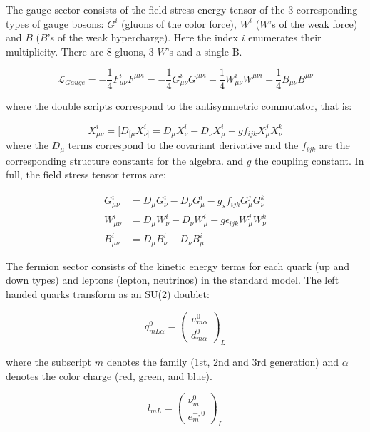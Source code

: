 The gauge sector consists of the field stress energy tensor of the 3 corresponding types of gauge bosons:
 $G^i$ (gluons of the color force), $W^i$ ($W$'s of the weak force) and $B$ ($B$'s of the weak hypercharge). 
Here the index $i$ enumerates their multiplicity. There are 8 gluons, 3 $W$'s and a single B. 

\begin{equation}
\mathcal{L}_{Gauge} = - \frac{1}{4} F_{\mu\nu}^{i} F^{\mu\nu i} =  - \frac{1}{4} G_{\mu\nu}^{i} G^{\mu\nu i} - \frac{1}{4} W^{i}_{\mu\nu} W^{\mu\nu i} - \frac{1}{4} B_{\mu\nu}B^{\mu\nu} 
\end{equation}

where the double scripts correspond to the antisymmetric commutator, that is:

\begin{equation}
X_{\mu\nu}^i = [ D_{[\mu} X_{\nu]}^i  = D_\mu X_\nu^i - D_\nu X_\mu^i - g f_{ijk} X_\mu^j X_\nu^k
\end{equation}
where the $D_\mu$ terms correspond to the covariant derivative and the $f_{ijk}$ are the corresponding structure constants for the algebra. and $g$
the coupling constant. In full, the field stress tensor terms are:

\begin{align*}
G_{\mu\nu}^i &=  D_\mu G_\nu^i - D_\nu G_\mu^i - g_s f_{ijk} G_\mu^j G_\nu^k\\ 
W_{\mu\nu}^i &=   D_\mu W_\nu^i - D_\nu W_\mu^i - g \epsilon_{ijk} W_\mu^j W_\nu^k\\ 
B_{\mu\nu}^i &=  D_\mu B_\nu^i - D_\nu B_\mu^i
\end{align*}

The fermion sector consists of the kinetic energy terms for each quark (up and down types) and leptons (lepton, neutrinos) in the standard model.
The left handed quarks transform as an SU(2) doublet:

\begin{equation}
q^0_{mL\alpha} = \left( \begin{array}{c} u_{m\alpha}^0  \\ d_{m\alpha}^0 \end{array} \right)_L 
\end{equation}

where the subscript $m$ denotes the family (1st, 2nd and 3rd generation) and $\alpha$ denotes the color charge (red, green, and blue).

\begin{equation}
l_{mL} = \left( \begin{array}{c} \nu_{m}^0  \\ e^{-,0}_{m} \end{array} \right)_L 
\end{equation}

